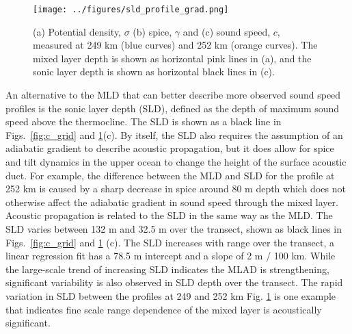 \documentclass[preprint,NumberedRefs]{JASA}
\begin{document}
\begin{figure}
\texttt{[image: ../figures/sld\_profile\_grad.png]}
    \caption{\label{fig:profiles}{(a) Potential density, $\sigma$ (b) spice, $\gamma$ and (c) sound speed, $c$, measured at 249 km (blue curves) and 252 km (orange curves). The mixed layer depth is shown as horizontal pink lines in (a), and the sonic layer depth is shown as horizontal black lines in (c).}}
\end{figure}

An alternative to the MLD that can better describe more observed sound speed profiles is the sonic layer depth (SLD), defined as the depth of maximum sound speed above the thermocline. The SLD is shown as a black line in Figs.~\ref{fig:c_grid} and \ref{fig:profiles}(c). By itself, the SLD also requires the assumption of an adiabatic gradient to describe acoustic propagation, but it does allow for spice and tilt dynamics in the upper ocean to change the height of the surface acoustic duct. For example, the difference between the MLD and SLD for the profile at 252 km is caused by a sharp decrease in spice around 80 m depth which does not otherwise affect the adiabatic gradient in sound speed through the mixed layer. Acoustic propagation is related to the SLD in the same way as the MLD. The SLD varies between 132 m and 32.5 m over the transect, shown as black lines in Figs.~\ref{fig:c_grid} and \ref{fig:profiles} (c). The SLD increases with range over the transect, a linear regression fit has a 78.5 m intercept and a slope of 2 m / 100 km. While the large-scale trend of increasing SLD indicates the MLAD is strengthening, significant variability is also observed in SLD depth over the transect. The rapid variation in SLD between the profiles at 249 and 252 km Fig. \ref{fig:profiles} is one example that indicates fine scale range dependence of the mixed layer is acoustically significant.
\end{document}
